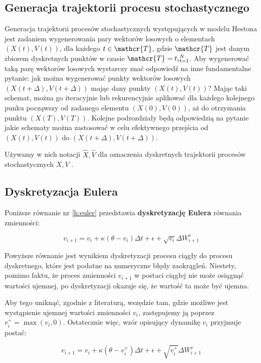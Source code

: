 \documentclass{pracamgr}
\begin{document}
\subsection{Generacja trajektorii procesu stochastycznego}
Generacja trajektorii procesów stochastycznych występujących w modelu Hestona jest zadaniem wygenerowania pary wektorów 
losowych o elementach $(X(t), V(t))$, dla każdego $t \in \mathcr{T}$, gdzie $\mathcr{T}$ jest danym zbiorem dyskretnych punktów w czasie $\mathcr{T}  = {t_i}^N_{t=1}$. Aby wygenerować taką parę wektorów losowych wystarczy znać odpowiedź na inne fundamentalne pytanie: jak można wygenerować punkty wektorów losowych $(X(t+ \Delta), V(t+ \Delta))$
mając dany punkty $(X(t), V(t))$? Mając taki schemat, można go iteracyjnie lub rekurencyjnie aplikować dla każdego kolejnego punku począwszy od zadanego elementu $(X(0), V(0))$, aż do otrzymania punktu $(X(T), V(T))$.
Kolejne podrozdziały będą odpowiedzią na pytanie jakie schematy można zastosować w celu efektywnego przejścia od $(X(t), V(t))$ do $(X(t+ \Delta), V(t+ \Delta))$.

Używamy w nich notacji $\hat{X}, \hat{V}$ dla oznaczenia dyskretnych trajektorii procesów stochastycznych $X, V$ .

\subsection{Dyskretyzacja Eulera}

Poniższe równanie nr \ref{h:euler} przedstawia \textbf{dyskretyzację Eulera} równania zmienności:
 
\begin{equation}\label{h:euler}
v_{i+1}  = v_i + \kappa (\theta - v_i) \Delta t + \epsilon +  \sqrt{v_i} \Delta W^{v}_{i+1}
\end{equation}

Powyższe równanie jest wynikiem dyskretyzacji procesu ciągły do procesu dyskretnego, które jest
podatne na numeryczne błędy zaokrągleń. Niestety, pomimo faktu, że proces zmienności $v_{i+1}$ w postaci ciągłej nie może osiągnąć wartości ujemnej, po dyskretyzacji okazuje się, że wartość ta może być ujemna. 

Aby tego uniknąć, zgodnie z literaturą, wszędzie tam, gdzie możliwe jest wystąpienie ujemnej 
wartości zmienności $v_i$, zastępujemy ją poprzez $v_i^+ = \max(v_i, 0)$. Ostatecznie więc, wzór
opisujący dynamikę $v_i$ przyjmuje postać:

\begin{equation}\label{h:eulerNonZero}
v_{i+1}  = v_i + \kappa (\theta - v_i^+) \Delta t + \epsilon +  \sqrt{v_i^+} \Delta W^{v}_{i+1}
\end{equation}
\end{document}
